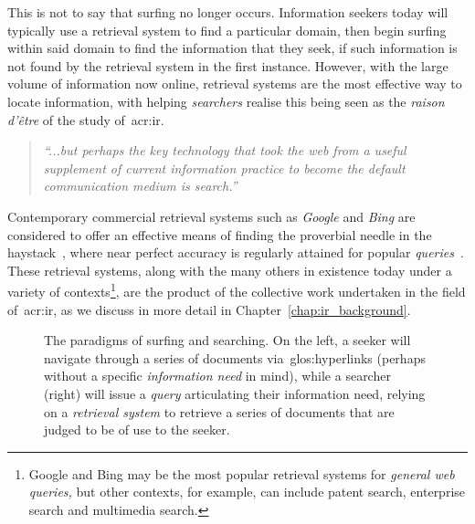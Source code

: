 This is not to say that surfing no longer occurs. Information seekers today will typically use a retrieval system to find a particular domain, then begin surfing within said domain to find the information that they seek, if such information is not found by the retrieval system in the first instance. However, with the large volume of information now online, retrieval systems are the most effective way to locate information, with helping \emph{searchers} realise this being seen as the \emph{raison d'\^{e}tre} of the study of~\gls{acr:ir}.

\begin{quote}
    \emph{``...but perhaps the key technology that took the web from a useful supplement of current information practice to become the default communication medium is search.''}
\end{quote}

Contemporary commercial retrieval systems such as \emph{Google} and \emph{Bing} are considered to offer an effective means of finding the proverbial needle in the haystack~\citep{wilson2010keyword_search}, where near perfect accuracy is regularly attained for popular \emph{queries}~\citep{vaughan2004new_measurements}. These retrieval systems, along with the many others in existence today under a variety of contexts\footnote{Google and Bing may be the most popular retrieval systems for \emph{general web queries,} but other contexts, for example, can include patent search, enterprise search and multimedia search.}, are the product of the collective work undertaken in the field of~\gls{acr:ir}, as we discuss in more detail in Chapter~\ref{chap:ir_background}.

\begin{figure}[t!]
    \centering
    \caption[Surfing vs. Searching]{The paradigms of surfing and searching. On the left, a seeker will navigate through a series of documents via~\glspl{glos:hyperlink} (perhaps without a specific \emph{information need} in mind), while a searcher (right) will issue a \emph{query} articulating their information need, relying on a \emph{retrieval system} to retrieve a series of documents that are judged to be of use to the seeker.}
    \label{fig:ch1-surfing}
\end{figure}

